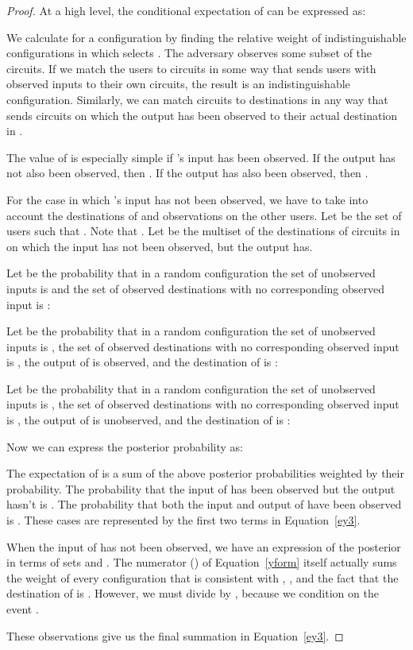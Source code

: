 \documentclass[prodmode,acmtissec]{acmsmall}
\begin{document}
\begin{theorem} \label{yexp}





\end{theorem}
\begin{proof}
At a high level, the conditional expectation of  can be expressed as:


We calculate  for a configuration  by finding the relative weight of indistinguishable configurations in which  selects .  The adversary observes some subset of the circuits.  If we match the users to circuits in some way that sends users with observed inputs to their own circuits, the result is an indistinguishable configuration.  Similarly, we can match circuits to destinations in any way that sends circuits on which the output has been observed to their actual destination in .

The value of  is especially simple if 's input has been observed.  If the output has not also been observed, then .  If the output has also been observed, then .

For the case in which 's input has not been observed, we have to take into account the destinations of and observations on the other users.  Let  be the set of users  such that .  Note that .  Let  be the multiset of the destinations of circuits in  on which the input has not been observed, but the output has.

Let  be the probability that in a random configuration the set of unobserved inputs is  and the set of observed destinations with no corresponding observed input is :


Let  be the probability that in a random configuration the set of unobserved inputs is , the set of observed destinations with no corresponding observed input is , the output of  is observed, and the destination of  is :


Let  be the probability that in a random configuration the set of unobserved inputs is , the set of observed destinations with no corresponding observed input is , the output of  is unobserved, and the destination of  is :


Now we can express the posterior probability  as:


The expectation of  is a sum of the above posterior probabilities weighted by their probability.  The probability that the input of  has been observed but the output hasn't is .  The probability that both the input and output of  have been observed is .  These cases are represented by the first two terms in Equation~\ref{ey3}.

When the input of  has not been observed, we have an expression of the posterior in terms of sets  and .  The numerator () of Equation~\ref{yform} itself actually sums the weight of every configuration that is consistent with , , and the fact that the destination of  is .  However, we must divide by , because we condition on the event .

These observations give us the final summation in Equation~\ref{ey3}.
\end{proof}
\end{document}
